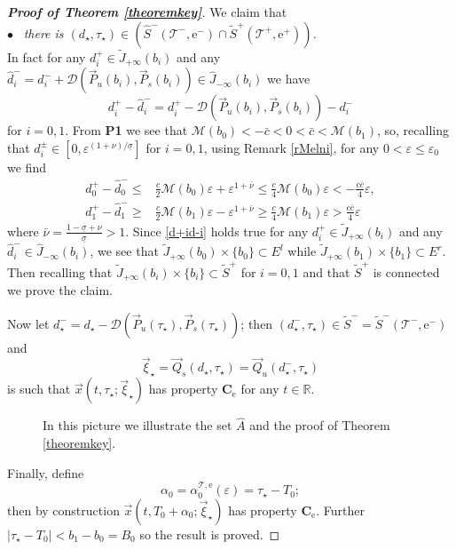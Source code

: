 \documentclass[10pt]{article}
\numberwithin{equation}{section}
\def\ep{\varepsilon}
\def\R{{\mathbb R}}
\def\ee{{\mathrm e}}
\def\MM{{\mathcal M}}
\def\TT{{\mathcal T}}
\def\DDD{\mathscr{D}}
\def\Q{\vec{Q}}
\def\P{\vec{P}}
\def\xxi{\vec{\xi}}
\def\x{\vec{x}}
\newcommand\bs[1]{{\boldsymbol{#1}}}
\newcommand\assump[1]{{\rm\textbf{#1}}}
\theoremstyle{definition}
\theoremstyle{remark}
\begin{document}
\begin{proof}[\textbf{Proof of Theorem \ref{theoremkey}}]

We claim that
\\ $\bullet$ \ \emph{there is  $(d_{\star},\tau_{\star}) \in (\hat{S}^-(\TT^-, \ee^-) \cap  \tilde{S}^+(\TT^+, \ee^+))$. }
\\
In fact for any
$d^+_i \in \tilde{J}_{+\infty}(b_i)$ and any $\hat{d}^-_i= d^-_i+ \DDD(\P_u(b_i), \P_s(b_i)) \in \hat{J}_{-\infty}(b_i)$ we have
$$d^+_i-\hat{d}^-_i = d^+_i- \DDD(\P_u(b_i), \P_s(b_i))- d^-_i$$
for $i=0,1$.  From \assump{P1} we see that $\MM(b_0)<-\bar{c}<0<\bar{c}<\MM(b_1)$, so, recalling that $d^{\pm}_i \in [0, \ep^{(1+\nu)/ \underline{\sigma}}]$ for $i=0,1$,
  using Remark \ref{rMelni},   for any $0<\ep \le \ep_0$  we find
\begin{equation}\label{d+id-i}
  \begin{split}
     d^+_0-\hat{d}^-_0 \le  &   \frac{c}{2} \MM(b_0) \ep +\ep^{1+\bar{\nu} } \le    \frac{c}{4} \MM(b_0) \ep  <  -
     \frac{c\bar{c}}{4} \ep , \\
     d^+_1-\hat{d}^-_1 \ge  &  \frac{c}{2} \MM(b_1)\ep  -\ep^{1+\bar{\nu} } \ge   \frac{c}{4} \MM(b_1) \ep  >
     \frac{c\bar{c}}{4} \ep
  \end{split}
\end{equation}
where $\bar{\nu}= \frac{1-\underline{\sigma}+\nu}{\underline{\sigma}}>1$.
Since \eqref{d+id-i} holds true for any $d^+_i \in \tilde{J}_{+\infty}(b_i)$ and any $\hat{d}^-_i \in \hat{J}_{-\infty}(b_i)$, we see
that
$\tilde{J}_{+\infty}(b_0)\times\{b_0\}  \subset  E^l$ while $\tilde{J}_{+\infty}(b_1)\times\{b_1\}  \subset  E^r$.
Then recalling that $\tilde{J}_{+\infty}(b_i)\times\{b_i\} \subset \tilde{S}^+$ for $i=0,1$ and that $\tilde{S}^+$
is connected we prove the claim.



Now let $d^-_\star=d_\star- \DDD(\P_u(\tau_\star), \P_s(\tau_\star))$; then $(d^-_\star,\tau_\star) \in
\tilde{S}^-=\tilde{S}^-(\TT^-, \ee^-)$ and
$$\xxi_\star = \Q_s(d_\star,\tau_\star)= \Q_u(d^-_\star,\tau_\star)$$
is such that $\x(t,\tau_\star; \xxi_\star)$ has property $\bs{C_{\ee}}$ for any $t \in \R$.

\begin{figure}[t]
\centerline{}
\caption{In this picture we illustrate the set $\hat{A}$ and the proof of Theorem \ref{theoremkey}.
}\label{intersection}
\end{figure}

Finally, define
\begin{equation}\label{alpha0}
  \alpha_0= \alpha^{\TT, \ee}_0 (\ep)= \tau_\star-T_0;
\end{equation}
then by construction $\x(t,T_0+ \alpha_0 ; \xxi_\star)$ has property $\bs{C_{\ee}}$.
Further $|\tau_\star-T_0|<b_1-b_0=B_0$ so the result is proved.
\end{proof}
\end{document}
